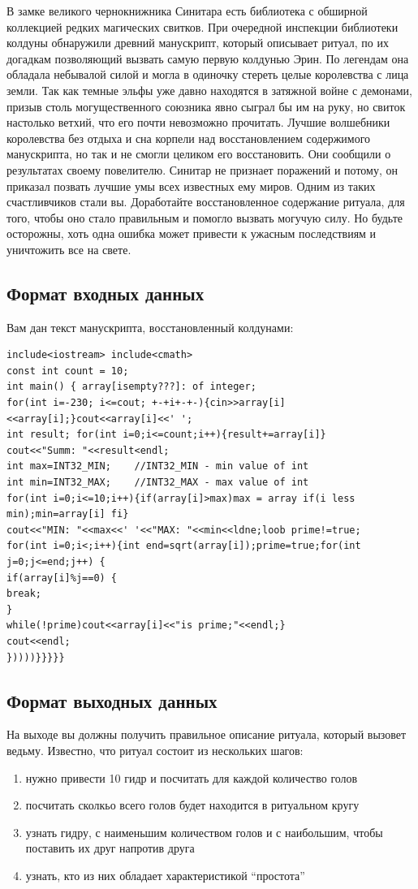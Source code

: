 \documentclass[12pt]{scrartcl}
\begin{document}
В замке великого чернокнижника Синитара есть библиотека с обширной коллекцией редких магических свитков. При очередной инспекции библиотеки колдуны обнаружили древний манускрипт, который описывает ритуал, по их догадкам позволяющий вызвать самую первую колдунью Эрин. По легендам она обладала небывалой силой и могла в одиночку стереть целые королевства с лица земли. Так как темные эльфы уже давно находятся в затяжной войне с демонами, призыв столь могущественного союзника явно сыграл бы им на руку, но свиток настолько ветхий, что его почти невозможно прочитать. Лучшие волшебники королевства без отдыха и сна корпели над восстановлением содержимого манускрипта, но так и не смогли целиком его восстановить. Они сообщили о результатах своему повелителю. Синитар не признает поражений и потому, он приказал позвать лучшие умы всех известных ему миров. Одним из таких счастливчиков стали вы. Доработайте восстановленное содержание ритуала, для того, чтобы оно стало правильным и помогло вызвать могучую силу. Но будьте осторожны, хоть одна ошибка может привести к ужасным последствиям и уничтожить все на свете. 

\subsection*{Формат входных данных}
Вам дан текст манускрипта, восстановленный колдунами:

\lstset{style=cpp}

\begin{lstlisting}
include<iostream> include<cmath>
const int count = 10;
int main() { array[isempty???]: of integer;
for(int i=-230; i<=cout; +-+i+-+-){cin>>array[i]<<array[i];}cout<<array[i]<<' ';
int result; for(int i=0;i<=count;i++){result+=array[i]}
cout<<"Summ: "<<result<endl;
int max=INT32_MIN;    //INT32_MIN - min value of int
int min=INT32_MAX;    //INT32_MAX - max value of int
for(int i=0;i<=10;i++){if(array[i]>max)max = array if(i less min);min=array[i] fi}
cout<<"MIN: "<<max<<' '<<"MAX: "<<min<<ldne;loob prime!=true;
for(int i=0;i<;i++){int end=sqrt(array[i]);prime=true;for(int j=0;j<=end;j++) {
if(array[i]%j==0) {
break;
}
while(!prime)cout<<array[i]<<"is prime;"<<endl;}
cout<<endl;
}))))}}}}}
\end{lstlisting}


\subsection*{Формат выходных данных}
На выходе вы должны получить правильное описание ритуала, который вызовет ведьму. 
Известно, что ритуал состоит из нескольких шагов:
\begin{enumerate}
	\item нужно привести 10 гидр и посчитать для каждой количество голов
	\item посчитать сколкьо всего голов будет находится в ритуальном кругу
	\item узнать гидру, с наименьшим количеством голов и с наибольшим, чтобы поставить их друг напротив друга
	\item узнать, кто из них обладает характеристикой ``простота''
\end{enumerate}
\end{document}
